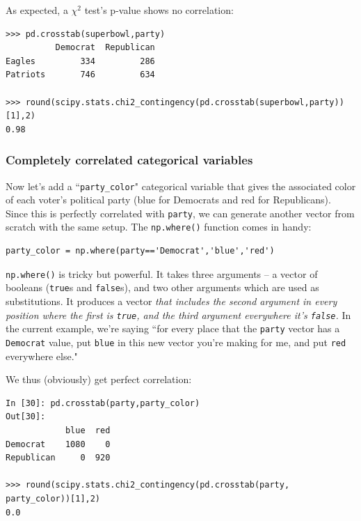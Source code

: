 \documentclass[12pt]{article}
\begin{document}
As expected, a $\chi^2$ test's p-value shows no correlation:

\begin{Verbatim}[fontsize=\footnotesize,samepage=true]
>>> pd.crosstab(superbowl,party)
          Democrat  Republican
Eagles         334         286
Patriots       746         634

>>> round(scipy.stats.chi2_contingency(pd.crosstab(superbowl,party))[1],2)
0.98
\end{Verbatim}

\subsubsection{Completely correlated categorical variables}

Now let's add a ``\texttt{party\_color}" categorical variable that gives the
associated color of each voter's political party (blue for Democrats and red
for Republicans). Since this is perfectly correlated with \texttt{party}, we
can generate another vector from scratch with the same setup. The
\texttt{np.where()} function comes in handy:

\begin{Verbatim}[fontsize=\footnotesize,samepage=true]
party_color = np.where(party=='Democrat','blue','red')
\end{Verbatim}

\texttt{np.where()} is tricky but powerful. It takes three arguments -- a
vector of booleans (\texttt{true}s and \texttt{false}s), and two other
arguments which are used as substitutions. It produces a vector \textit{that
includes the second argument in every position where the first is
\texttt{true}, and the third argument everywhere it's \texttt{false}.} In the
current example, we're saying ``for every place that the \texttt{party} vector
has a \texttt{\textquotesingle Democrat\textquotesingle } value, put
\texttt{\textquotesingle blue\textquotesingle } in this new vector you're
making for me, and put \texttt{\textquotesingle red\textquotesingle } everywhere else."

We thus (obviously) get perfect correlation:

\begin{Verbatim}[fontsize=\footnotesize,samepage=true]
In [30]: pd.crosstab(party,party_color)
Out[30]: 
            blue  red
Democrat    1080    0
Republican     0  920

>>> round(scipy.stats.chi2_contingency(pd.crosstab(party, party_color))[1],2)
0.0
\end{Verbatim}
\end{document}
